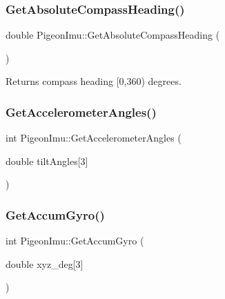 \mbox{\label{class_pigeon_imu_a04fa177dcd2e2cdd2ca3632ee6d8e844}} 
\subsubsection{\texorpdfstring{Get\+Absolute\+Compass\+Heading()}{GetAbsoluteCompassHeading()}}
{\footnotesize\ttfamily double Pigeon\+Imu\+::\+Get\+Absolute\+Compass\+Heading (\begin{DoxyParamCaption}{ }\end{DoxyParamCaption})}

\begin{DoxyReturn}{Returns}
compass heading \mbox{[}0,360) degrees. 
\end{DoxyReturn}
\mbox{\label{class_pigeon_imu_a6602abacdfbbebe812355fc0798d51ea}} 
\subsubsection{\texorpdfstring{Get\+Accelerometer\+Angles()}{GetAccelerometerAngles()}}
{\footnotesize\ttfamily int Pigeon\+Imu\+::\+Get\+Accelerometer\+Angles (\begin{DoxyParamCaption}\item[{double}]{tilt\+Angles\mbox{[}3\mbox{]} }\end{DoxyParamCaption})}

\mbox{\label{class_pigeon_imu_aafa8dc4f3e5e9e913e1baa46b68cba4e}} 
\subsubsection{\texorpdfstring{Get\+Accum\+Gyro()}{GetAccumGyro()}}
{\footnotesize\ttfamily int Pigeon\+Imu\+::\+Get\+Accum\+Gyro (\begin{DoxyParamCaption}\item[{double}]{xyz\+\_\+deg\mbox{[}3\mbox{]} }\end{DoxyParamCaption})}


